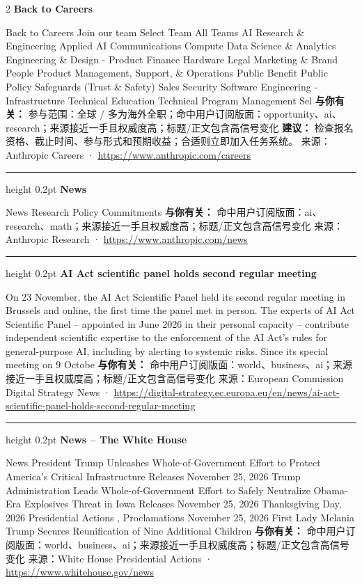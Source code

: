 \documentclass[10.5pt]{ctexart}
\begin{document}
\begin{multicols}{2}
{\large\bfseries Back to Careers}\par
Back to Careers Join our team Select Team All Teams AI Research \& Engineering Applied AI Communications Compute Data Science \& Analytics Engineering \& Design - Product Finance Hardware Legal Marketing \& Brand People Product Management, Support, \& Operations Public Benefit Public Policy Safeguards (Trust \& Safety) Sales Security Software Engineering - Infrastructure Technical Education Technical Program Management Sel
\textbf{与你有关：} 参与范围：全球 / 多为海外全职；命中用户订阅版面：opportunity、ai、research；来源接近一手且权威度高；标题/正文包含高信号变化
\textbf{建议：} 检查报名资格、截止时间、参与形式和预期收益；合适则立即加入任务系统。
{\footnotesize\color{ormuted} 来源：Anthropic Careers · \url{https://www.anthropic.com/careers}}
\vspace{2mm}
\hrule height 0.2pt
\vspace{2mm}
{\large\bfseries News}\par
News Research Policy Commitments
\textbf{与你有关：} 命中用户订阅版面：ai、research、math；来源接近一手且权威度高；标题/正文包含高信号变化
{\footnotesize\color{ormuted} 来源：Anthropic Research · \url{https://www.anthropic.com/news}}
\vspace{2mm}
\hrule height 0.2pt
\vspace{2mm}
{\large\bfseries AI Act scientific panel holds second regular meeting}\par
On 23 November, the AI Act Scientific Panel held its second regular meeting in Brussels and online, the first time the panel met in person. The experts of AI Act Scientific Panel – appointed in June 2026 in their personal capacity – contribute independent scientific expertise to the enforcement of the AI Act's rules for general-purpose AI, including by alerting to systemic risks. Since its special meeting on 9 Octobe
\textbf{与你有关：} 命中用户订阅版面：world、business、ai；来源接近一手且权威度高；标题/正文包含高信号变化
{\footnotesize\color{ormuted} 来源：European Commission Digital Strategy News · \url{https://digital-strategy.ec.europa.eu/en/news/ai-act-scientific-panel-holds-second-regular-meeting}}
\vspace{2mm}
\hrule height 0.2pt
\vspace{2mm}
{\large\bfseries News – The White House}\par
News President Trump Unleashes Whole-of-Government Effort to Protect America’s Critical Infrastructure Releases November 25, 2026 Trump Administration Leads Whole-of-Government Effort to Safely Neutralize Obama-Era Explosives Threat in Iowa Releases November 25, 2026 Thanksgiving Day, 2026 Presidential Actions , Proclamations November 25, 2026 First Lady Melania Trump Secures Reunification of Nine Additional Children
\textbf{与你有关：} 命中用户订阅版面：world、business、ai；来源接近一手且权威度高；标题/正文包含高信号变化
{\footnotesize\color{ormuted} 来源：White House Presidential Actions · \url{https://www.whitehouse.gov/news}}
\end{multicols}
\end{document}

